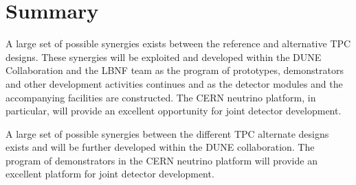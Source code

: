 \section{Summary}
A large set of possible synergies exists between the reference and alternative TPC
designs. These synergies will be exploited and developed within the DUNE
Collaboration and the LBNF team as the program of prototypes, demonstrators and other 
development activities continues and as
the detector modules and the accompanying facilities are constructed. The CERN neutrino
platform, in particular, will provide an excellent opportunity for joint detector development.

A large set of possible synergies  between the different TPC alternate
designs exists and will be further developed within the DUNE
collaboration.  The program of demonstrators in the CERN neutrino
platform will provide an excellent platform for joint detector
development.
